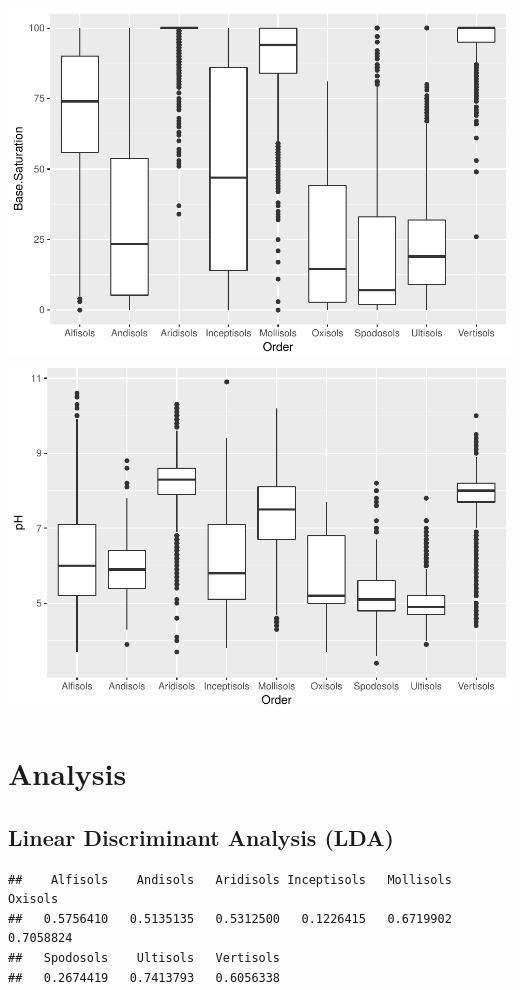 \documentclass[]{article}
\begin{document}
\includegraphics{Project1_files/figure-latex/EDA - Mer-7.pdf}
\includegraphics{Project1_files/figure-latex/EDA - Mer-8.pdf}

\section{Analysis}\label{analysis}

\subsection{Linear Discriminant Analysis
(LDA)}\label{linear-discriminant-analysis-lda}

\begin{verbatim}
##    Alfisols    Andisols   Aridisols Inceptisols   Mollisols     Oxisols 
##   0.5756410   0.5135135   0.5312500   0.1226415   0.6719902   0.7058824 
##   Spodosols    Ultisols   Vertisols 
##   0.2674419   0.7413793   0.6056338
\end{verbatim}
\end{document}
